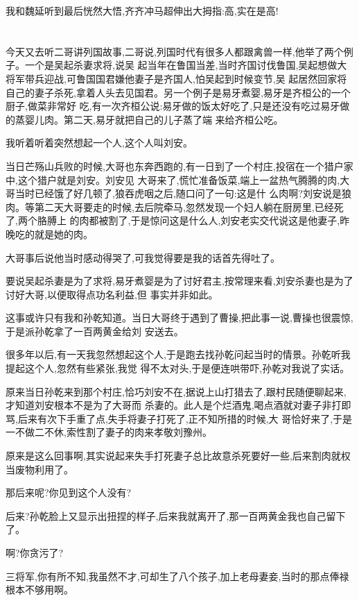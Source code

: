 ﻿\documentclass[12pt,twocolumn]{article}
\begin{document}
我和魏延听到最后恍然大悟,齐齐冲马超伸出大拇指:高,实在是高!

\section{}

今天又去听二哥讲列国故事,二哥说,列国时代有很多人都跟禽兽一样,他举了两个例子。一个是吴起杀妻求将,说吴
起当年在鲁国当差,当时齐国讨伐鲁国,吴起想做大将军带兵迎战,可鲁国国君嫌他妻子是齐国人,怕吴起到时候变节,吴
起居然回家将自己的妻子杀死,拿着人头去见国君。另一个例子是易牙煮婴,易牙是齐桓公的一个厨子,做菜非常好
吃,有一次齐桓公说:易牙做的饭太好吃了,只是还没有吃过易牙做的蒸婴儿肉。第二天,易牙就把自己的儿子蒸了端
来给齐桓公吃。

我听着听着突然想起一个人,这个人叫刘安。

当日芒殇山兵败的时候,大哥也东奔西跑的,有一日到了一个村庄,投宿在一个猎户家中,这个猎户就是刘安。刘安见
大哥来了,慌忙准备饭菜,端上一盆热气腾腾的肉,大哥当时已经饿了好几顿了,狼吞虎咽之后,随口问了一句:这是什
么肉啊?刘安说是狼肉。等第二天大哥要走的时候,去后院牵马,忽然发现一个妇人躺在厨房里,已经死了,两个胳膊上
的肉都被割了,于是惊问这是什么人,刘安老实交代说这是他妻子,昨晚吃的就是她的肉。

大哥事后说他当时感动得哭了,可我觉得要是我的话首先得吐了。

要说吴起杀妻是为了求将,易牙煮婴是为了讨好君主,按常理来看,刘安杀妻也是为了讨好大哥,以便取得点功名利益,但
事实并非如此。

这事或许只有我和孙乾知道。当日大哥终于遇到了曹操,把此事一说,曹操也很震惊,于是派孙乾拿了一百两黄金给刘
安送去。

很多年以后,有一天我忽然想起这个人,于是跑去找孙乾问起当时的情景。孙乾听我提起这个人,忽然有些紧张,我觉
得不太对头,于是便连哄带吓,孙乾对我说了实话。

原来当日孙乾来到那个村庄,恰巧刘安不在,据说上山打猎去了,跟村民随便聊起来,才知道刘安根本不是为了大哥而
杀妻的。此人是个烂酒鬼,喝点酒就对妻子非打即骂,后来有次下手重了点,失手将妻子打死了,正不知所措的时候,大
哥恰好来了,于是一不做二不休,索性割了妻子的肉来孝敬刘豫州。

原来是这么回事啊,其实说起来失手打死妻子总比故意杀死要好一些,后来割肉就权当废物利用了。

那后来呢?你见到这个人没有?

后来?孙乾脸上又显示出扭捏的样子,后来\dldots 我就离开了,那一百两黄金我也自己留下了。

啊?你贪污了?

三将军,你有所不知,我虽然不才,可却生了八个孩子,加上老母妻妾,当时的那点俸禄根本不够用啊。
\end{document}
